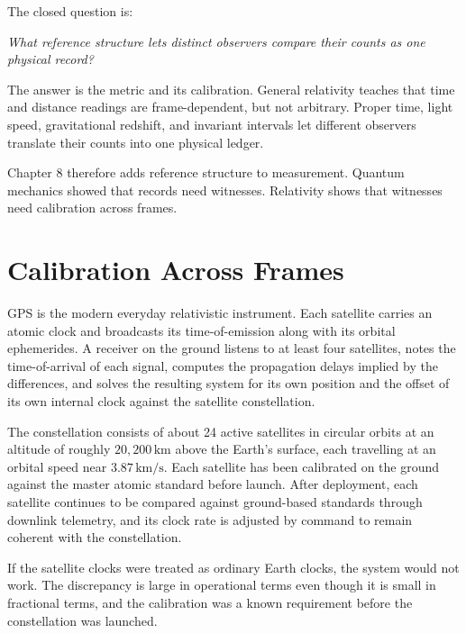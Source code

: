 \begin{chapteressay}
The closed question is:

\begin{center}
\emph{What reference structure lets distinct observers compare their counts as
one physical record?}
\end{center}

The answer is the metric and its calibration. General relativity teaches that
time and distance readings are frame-dependent, but not arbitrary. Proper time,
light speed, gravitational redshift, and invariant intervals let different
observers translate their counts into one physical ledger.

Chapter 8 therefore adds reference structure to measurement. Quantum mechanics
showed that records need witnesses. Relativity shows that witnesses need
calibration across frames.

\end{chapteressay}


\section{Calibration Across Frames}
\label{se:calibration-across-frames}

GPS is the modern everyday relativistic instrument. Each satellite carries an
atomic clock and broadcasts its time-of-emission along with its orbital
ephemerides. A receiver on the ground listens to at least four satellites,
notes the time-of-arrival of each signal, computes the propagation delays
implied by the differences, and solves the resulting system for its own
position and the offset of its own internal clock against the satellite
constellation.

The constellation consists of about 24 active satellites in circular orbits
at an altitude of roughly $20{,}200\,\mathrm{km}$ above the Earth's surface,
each travelling at an orbital speed near $3{.}87\,\mathrm{km/s}$. Each
satellite has been calibrated on the ground against the master atomic
standard before launch. After deployment, each satellite continues to be
compared against ground-based standards through downlink telemetry, and its
clock rate is adjusted by command to remain coherent with the constellation.

If the satellite clocks were treated as ordinary Earth clocks, the system
would not work. The discrepancy is large in operational terms even though it
is small in fractional terms, and the calibration was a known requirement
before the constellation was launched.

